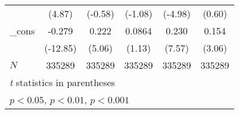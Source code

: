 \begin{table}[htbp]
\begin{tabular}{l*{5}{c}}
            &      (4.87)         &     (-0.58)         &     (-1.08)         &     (-4.98)         &      (0.60)         \\
\_cons      &      -0.279\sym{***}&       0.222\sym{***}&      0.0864         &       0.230\sym{***}&       0.154\sym{**} \\
            &    (-12.85)         &      (5.06)         &      (1.13)         &      (7.57)         &      (3.06)         \\
\hline
\(N\)       &      335289         &      335289         &      335289         &      335289         &      335289         \\
\hline\hline
\multicolumn{6}{l}{\footnotesize \textit{t} statistics in parentheses}\\
\multicolumn{6}{l}{\footnotesize \sym{*} \(p<0.05\), \sym{**} \(p<0.01\), \sym{***} \(p<0.001\)}\\
\end{tabular}
\end{table}
